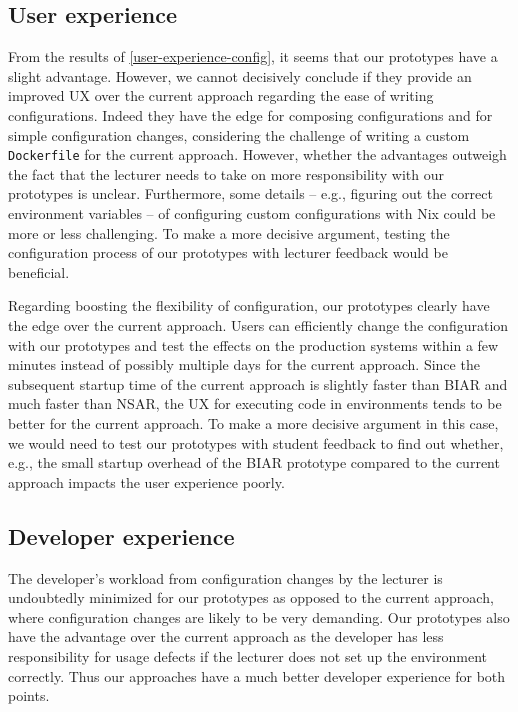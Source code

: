 \subsection{User experience}\label{discussion:UX}
From the results of \ref{user-experience-config}, it seems that our prototypes have a slight advantage. However, we cannot decisively conclude if they provide an improved UX over the current approach regarding the ease of writing configurations. Indeed they have the edge for composing configurations and for simple configuration changes, considering the challenge of writing a custom \verb|Dockerfile| for the current approach. However, whether the advantages outweigh the fact that the lecturer needs to take on more responsibility with our prototypes is unclear. Furthermore, some details -- e.g., figuring out the correct environment variables -- of configuring custom configurations with Nix could be more or less challenging. To make a more decisive argument, testing the configuration process of our prototypes with lecturer feedback would be beneficial.

Regarding boosting the flexibility of configuration, our prototypes clearly have the edge over the current approach. Users can efficiently change the configuration with our prototypes and test the effects on the production systems within a few minutes instead of possibly multiple days for the current approach. Since the subsequent startup time of the current approach is slightly faster than BIAR and much faster than NSAR, the UX for executing code in environments tends to be better for the current approach. To make a more decisive argument in this case, we would need to test our prototypes with student feedback to find out whether, e.g., the small startup overhead of the BIAR prototype compared to the current approach impacts the user experience poorly. 

\subsection{Developer experience}\label{discussion:DevX}
The developer's workload from configuration changes by the lecturer is undoubtedly minimized for our prototypes as opposed to the current approach, where configuration changes are likely to be very demanding. Our prototypes also have the advantage over the current approach as the developer has less responsibility for usage defects if the lecturer does not set up the environment correctly. Thus our approaches have a much better developer experience for both points. 

